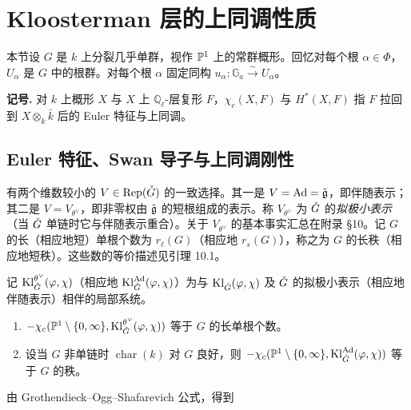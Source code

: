 
\section{Kloosterman 层的上同调性质}

本节设 $G$ 是 $k$ 上分裂几乎单群，视作 $\mathbb{P}^1$ 上的常群概形。回忆对每个根 $\alpha\in\Phi$，$U_\alpha$ 是 $G$ 中的根群。对每个根 $\alpha$ 固定同构 $u_\alpha:\mathbb{G}_a\xrightarrow{\sim}U_\alpha$。

\medskip\noindent\textbf{记号.} 对 $k$ 上概形 $X$ 与 $X$ 上 $\mathbb{Q}_\ell$-层复形 $F$，$\chi_c(X,F)$ 与 $H^*(X,F)$ 指 $F$ 拉回到 $X\otimes_k\bar k$ 后的 Euler 特征与上同调。

\subsection{Euler 特征、Swan 导子与上同调刚性}

有两个维数较小的 $V\in\mathrm{Rep}(\check G)$ 的一致选择。其一是 $V=\mathrm{Ad}=\check{\mathfrak g}$，即伴随表示；其二是 $V=V_{\theta^\vee}$，即非零权由 $\check{\mathfrak g}$ 的短根组成的表示。称 $V_{\theta^\vee}$ 为 $\check G$ 的\emph{拟极小表示}（当 $\check G$ 单链时它与伴随表示重合）。关于 $V_{\theta^\vee}$ 的基本事实汇总在附录 §10。记 $G$ 的长（相应地短）单根个数为 $r_\ell(G)$（相应地 $r_s(G)$），称之为 $G$ 的长秩（相应地短秩）。这些数的等价描述见引理 10.1。

记 $\mathrm{Kl}^{\theta^\vee}_{\check G}(\varphi,\chi)$（相应地 $\mathrm{Kl}^{\mathrm{Ad}}_{\check G}(\varphi,\chi)$）为与 $\mathrm{Kl}_{\check G}(\varphi,\chi)$ 及 $\check G$ 的拟极小表示（相应地伴随表示）相伴的局部系统。

\begin{mainthm}[4]
\begin{enumerate}[label=(\arabic*), leftmargin=1.9em, itemsep=.25em]
\item $-\chi_c(\mathbb{P}^1\setminus\{0,\infty\},\mathrm{Kl}^{\theta^\vee}_{\check G}(\varphi,\chi))$ 等于 $G$ 的长单根个数。
\item 设当 $G$ 非单链时 $\operatorname{char}(k)$ 对 $G$ 良好，则 $-\chi_c(\mathbb{P}^1\setminus\{0,\infty\},\mathrm{Kl}^{\mathrm{Ad}}_{\check G}(\varphi,\chi))$ 等于 $G$ 的秩。
\end{enumerate}
\end{mainthm}

由 Grothendieck--Ogg--Shafarevich 公式，得到

